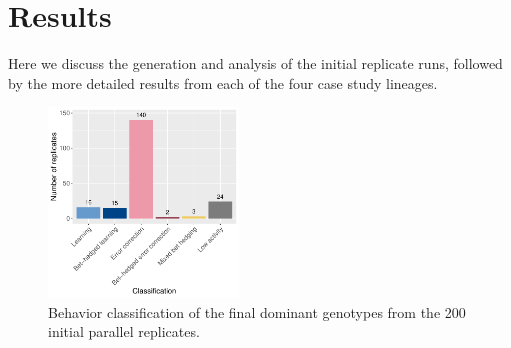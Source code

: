 \section{Results}

Here we discuss the generation and analysis of the initial replicate runs, followed by the more detailed results from each of the four case study lineages.

\begin{figure}[!h]
\begin{center}
\includegraphics[width=0.45\textwidth]{02_alife_2023_submission/media/final_dom_classification.pdf}
\caption{Behavior classification of the final dominant genotypes from the 200 initial parallel replicates.}
\label{fig-final-dom-classification}
\end{center}
\end{figure}


